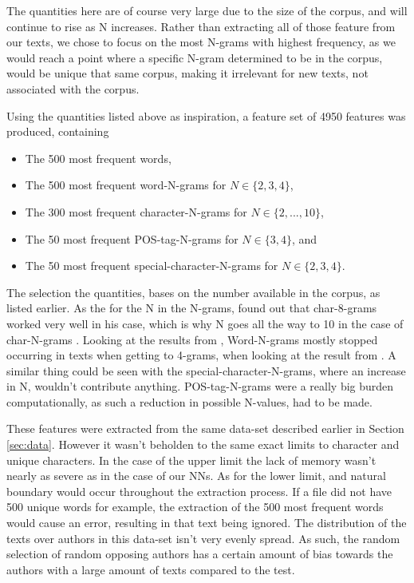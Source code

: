 The quantities here are of course very large due to the size of the corpus,
and will continue to rise as N increases. Rather than extracting all
of those feature from our texts, we chose to focus on the most N-grams
with highest frequency, as we would reach a point where a specific N-gram
determined to be in the corpus, would be unique that same corpus, making it
irrelevant for new texts, not associated with the corpus.

Using the quantities listed above as inspiration, a feature set of 4950
features was produced, containing

\begin{itemize}
    \item The 500 most frequent words,
    \item The 500 most frequent word-N-grams for $N \in \{2,3,4\}$,
    \item The 300 most frequent character-N-grams for $N \in \{2,...,10\}$,
    \item The 50 most frequent \gls{POS}-tag-N-grams for $N \in \{3,4\}$, and
    \item The 50 most frequent special-character-N-grams for $N \in \{2,3,4\}$.
\end{itemize}

The selection the quantities, bases on the number available in the corpus,
as listed earlier. As the for the N in the N-grams, \cite{aalykke2016} found
out that char-8-grams worked very well in his case, which is why N goes all
the way to 10 in the case of char-N-grams . Looking at the results
from \cite{US}, Word-N-grams mostly stopped occurring in texts when getting
to 4-grams, when looking at the result from \cite{US}. A similar thing
could be seen with the special-character-N-grams, where an increase in N,
wouldn't contribute anything. \gls{POS}-tag-N-grams were a really big burden
computationally, as such a reduction in possible N-values, had to be made.

These features were extracted from the same data-set described earlier in
Section \ref{sec:data}. However it wasn't beholden to the same exact limits to
character and unique characters. In the case of the upper limit the lack of
memory wasn't nearly as severe as in the case of our \gls{NN}s. As for the lower
limit, and natural boundary would occur throughout the extraction process.
If a file did not have 500 unique words for example, the extraction
of the 500 most frequent words would cause an error, resulting in that
text being ignored.
The distribution of the texts over authors in this data-set isn't
very evenly spread. As such, the random selection of random opposing
authors has a certain amount of bias towards the authors with a large
amount of texts compared to the test.

